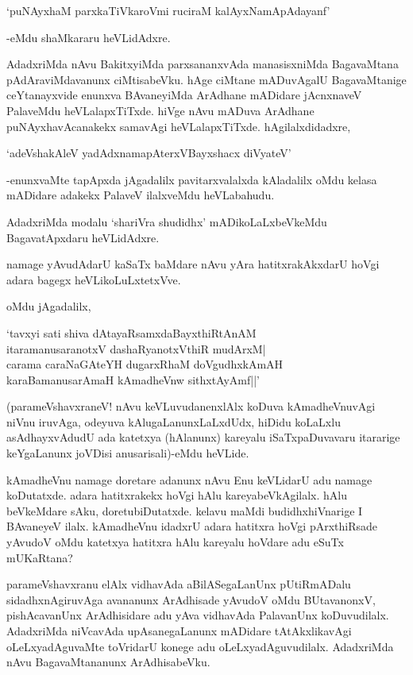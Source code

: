 \begin{shloka}
`puNAyxhaM parxkaTiVkaroVmi ruciraM kalAyxNamApAdayanf'
\end{shloka}

-eMdu shaMkararu heVLidAdxre.

AdadxriMda nAvu BakitxyiMda parxsananxvAda manasisxniMda BagavaMtana pAdAraviMdavanunx ciMtisabeVku. hAge ciMtane mADuvAgalU BagavaMtanige ceYtanayxvide enunxva BAvaneyiMda ArAdhane mADidare jAcnxnaveV PalaveMdu heVLalapxTiTxde. hiVge nAvu mADuva ArAdhane puNAyxhavAcanakekx samavAgi heVLalapxTiTxde. hAgilalxdidadxre,

\begin{shloka}
`adeVshakAleV yadAdxnamapAterxVBayxshacx diVyateV'
\end{shloka}

-enunxvaMte tapApxda jAgadalilx pavitarxvalalxda kAladalilx oMdu kelasa mADidare adakekx PalaveV ilalxveMdu heVLabahudu.

AdadxriMda modalu `shariVra shudidhx' mADikoLaLxbeVkeMdu BagavatApxdaru heVLidAdxre.

namage yAvudAdarU kaSaTx baMdare nAvu yAra hatitxrakAkxdarU hoVgi adara bagegx heVLikoLuLxtetxVve.

oMdu jAgadalilx, 

\begin{shloka}
`tavxyi sati shiva dAtayaRsamxdaBayxthiRtAnAM\\
itaramanusaranotxV dashaRyanotxVthiR mudArxM|\\
carama caraNaGAteYH dugarxRhaM doVgudhxkAmAH\\
karaBamanusarAmaH kAmadheVnw sithxtAyAmf||'
\end{shloka}

(parameVshavxraneV! nAvu keVLuvudanenxlAlx koDuva kAmadheVnuvAgi niVnu iruvAga, odeyuva kAlugaLanunxLaLxdUdx, hiDidu koLaLxlu asAdhayxvAdudU ada katetxya (hAlanunx) kareyalu iSaTxpaDuvavaru itararige keYgaLanunx joVDisi anusarisali)-eMdu heVLide.

kAmadheVnu namage doretare adanunx nAvu Enu keVLidarU adu namage koDutatxde. adara hatitxrakekx hoVgi hAlu kareyabeVkAgilalx. hAlu beVkeMdare sAku, doretubiDutatxde. kelavu maMdi budidhxhiVnarige I BAvaneyeV ilalx. kAmadheVnu idadxrU adara hatitxra hoVgi pArxthiRsade yAvudoV oMdu katetxya hatitxra hAlu kareyalu hoVdare adu eSuTx mUKaRtana? 

parameVshavxranu elAlx vidhavAda aBilASegaLanUnx pUtiRmADalu sidadhxnAgiruvAga avananunx ArAdhisade yAvudoV oMdu BUtavanonxV, pishAcavanUnx ArAdhisidare adu yAva vidhavAda PalavanUnx koDuvudilalx. AdadxriMda niVcavAda upAsanegaLanunx mADidare tAtAkxlikavAgi oLeLxyadAguvaMte toVridarU konege adu oLeLxyadAguvudilalx. AdadxriMda nAvu BagavaMtananunx ArAdhisabeVku.

